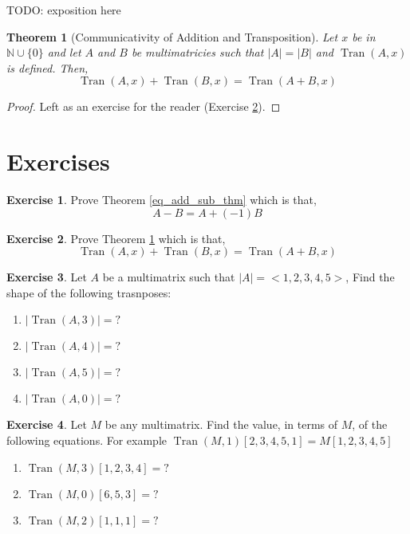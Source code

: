 \documentclass[12pt]{book}
\theoremstyle{definition}
\newtheorem{exercise}{Exercise}[chapter]
\theoremstyle{plain}
\newtheorem{theorem}{Theorem}[chapter]
\theoremstyle{ppart}
\theoremstyle{case}
\theoremstyle{solution}
\DeclareMathOperator{\Tran}{Tran}
\begin{document}
TODO: exposition here

\begin{theorem}[Communicativity of Addition and Transposition]
\label{com_add_tran_thm}
Let $x$ be in $\mathbb{N} \cup \{0\}$ and let $A$ and $B$ be
multimatricies such that $|A| = |B|$ and $\Tran(A, x)$ is defined.
Then,
\[ \Tran(A, x) + \Tran(B, x) = \Tran(A+B, x) \]
\end{theorem}
\begin{proof}
Left as an exercise for the reader (Exercise \ref{com_add_tran_ex}).
\end{proof}

\section{Exercises}

\begin{exercise}
\label{eq_add_sub_ex}
Prove Theorem \ref{eq_add_sub_thm} which is that,
\[ A - B = A + (-1)B \]
\end{exercise}

\begin{exercise}
\label{com_add_tran_ex}
Prove Theorem \ref{com_add_tran_thm} which is that,
\[ \Tran(A, x) + \Tran(B, x) = \Tran(A+B, x) \]
\end{exercise}

\begin{exercise}
Let $A$ be a multimatrix such that $|A| = <1,2,3,4,5>$,
Find the shape of the following trasnposes:
\begin{enumerate}
\item $|\Tran(A, 3)| = ?$
\item $|\Tran(A, 4)| = ?$
\item $|\Tran(A, 5)| = ?$
\item $|\Tran(A, 0)| = ?$
\end{enumerate}
\end{exercise}

\begin{exercise}
Let $M$ be any multimatrix.
Find the value, in terms of $M$, of the following equations.
For example $\Tran(M, 1)[2,3,4,5,1] = M[1,2,3,4,5]$
\begin{enumerate}
\item $\Tran(M, 3)[1,2,3,4] = ?$
\item $\Tran(M, 0)[6,5,3] = ?$
\item $\Tran(M, 2)[1,1,1] = ?$
\end{enumerate}
\end{exercise}
\end{document}
